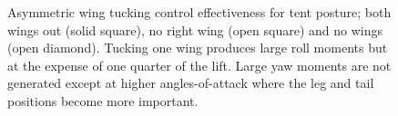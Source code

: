 \begin{figure}
\caption{Asymmetric wing tucking control effectiveness for tent posture; both wings out (solid square), no right wing (open square) and no wings (open diamond). Tucking one wing produces large roll moments but at the expense of one quarter of the lift.  Large yaw moments are not generated except at higher angles-of-attack where the leg and tail positions become more important.}
\end{figure}
